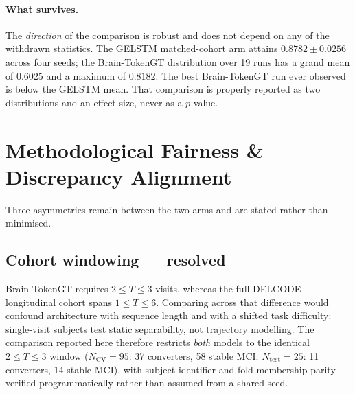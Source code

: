 
\paragraph{What survives.} The \emph{direction} of the comparison is robust and does not
depend on any of the withdrawn statistics. The GELSTM matched-cohort arm attains
$0.8782 \pm 0.0256$ across four seeds; the Brain-TokenGT distribution over 19 runs has a
grand mean of $0.6025$ and a maximum of $0.8182$. The best Brain-TokenGT run ever observed
is below the GELSTM mean. That comparison is properly reported as two distributions and an
effect size, never as a $p$-value.

\section{Methodological Fairness \& Discrepancy Alignment}
\label{sec:btgt-fairness}

Three asymmetries remain between the two arms and are stated rather than minimised.

\subsection{Cohort windowing --- resolved}

Brain-TokenGT requires $2 \le T \le 3$ visits, whereas the full DELCODE longitudinal cohort
spans $1 \le T \le 6$. Comparing across that difference would confound architecture with
sequence length and with a shifted task difficulty: single-visit subjects test static
separability, not trajectory modelling. The comparison reported here therefore restricts
\emph{both} models to the identical $2 \le T \le 3$ window ($N_{\text{CV}} = 95$: 37
converters, 58 stable MCI; $N_{\text{test}} = 25$: 11 converters, 14 stable MCI), with
subject-identifier and fold-membership parity verified programmatically rather than assumed
from a shared seed.

